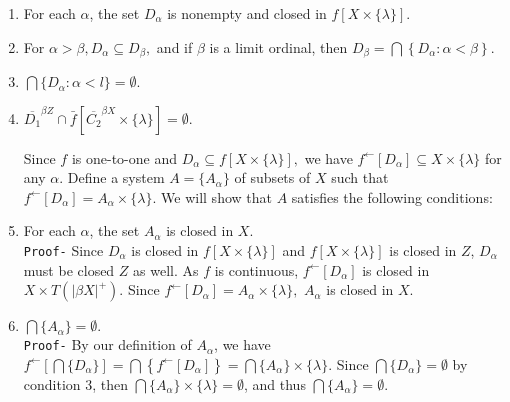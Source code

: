 \documentclass{article}
\begin{document}
																																				      \begin{enumerate}
																																				      \item For each $\alpha$, the set $D_\alpha$ is nonempty and closed in $f\left[X\times \{\lambda\}\right].$
																																				      \item For $\alpha>\beta, D_\alpha\subseteq D_\beta,$ and if $\beta$ is a limit ordinal, then $D_\beta=\bigcap\left\{ D_\alpha: \alpha< \beta\right\}$.
																																				      \item $\bigcap \{D_\alpha:\alpha<l\}=\emptyset$.
																																				      \item $\overline{D_1}^{\beta Z} \cap \bar{f}\left[\overline{C_2}^{\beta X} \times \{\lambda\}\right]=\emptyset.$

																																				      \vskip 30pt


																																				      Since $f$ is one-to-one and $D_\alpha\subseteq f\left[X\times \{\lambda\}\right],$ we have $ f^{\leftarrow}\left[D_\alpha\right]\subseteq X\times\{\lambda\}$ for any $\alpha$. Define a system $A=\{A_\alpha\}$ of subsets of $X$ such that $f^{\leftarrow}\left[D_\alpha\right]=A_\alpha\times\{\lambda\}.$ We will show that $A$ satisfies the following conditions: 


																																				      \vskip 25pt


																																				      \item For each $\alpha$, the set $A_\alpha$ is closed in $X$.\\
																																					  \texttt{Proof-} Since $D_\alpha$ is closed in $f\left[X\times\{\lambda\}\right]$ and $f\left[X\times\{\lambda\}\right]$ is closed in $Z$, $D_\alpha$ must be closed $Z$ as well. As $f$ is continuous, $f^{\leftarrow}\left[D_\alpha\right]$ is closed in $X\times T(|\beta X|^+).$ Since $f^{\leftarrow}\left[D_\alpha\right]=A_\alpha \times \{\lambda\},$  $A_\alpha$ is closed in $X$. \


																																					  \vskip 20pt	


																																					  \item $\bigcap\{A_\alpha\}=\emptyset.$\\
																																					      \texttt{Proof-} By our definition of $A_\alpha$, we have $f^{\leftarrow}\left[\bigcap\{D_\alpha\}\right]=\bigcap\left\{f^{\leftarrow}\left[D_\alpha\right]\right\}=\bigcap \{A_\alpha\}\times\{\lambda\}.$ Since $\bigcap \{D_\alpha\}=\emptyset $ by condition 3, then $\bigcap \{A_\alpha\}\times\{\lambda\}= \emptyset$, and thus $\bigcap \{A_\alpha\}= \emptyset.$



\end{enumerate}
\end{document}
